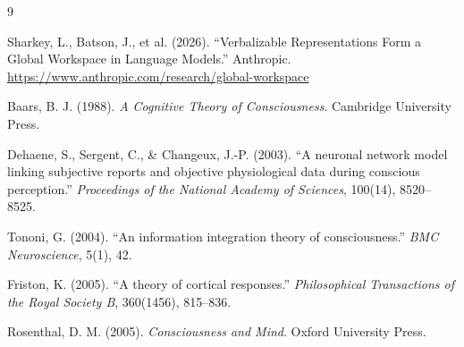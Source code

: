\documentclass[11pt,a4paper]{article}
\theoremstyle{definition}
\begin{document}
\begin{thebibliography}{9}

Sharkey, L., Batson, J., et al. (2026).
``Verbalizable Representations Form a Global Workspace in Language Models.''
Anthropic. \url{https://www.anthropic.com/research/global-workspace}

Baars, B. J. (1988).
\textit{A Cognitive Theory of Consciousness}.
Cambridge University Press.

Dehaene, S., Sergent, C., \& Changeux, J.-P. (2003).
``A neuronal network model linking subjective reports and objective
physiological data during conscious perception.''
\textit{Proceedings of the National Academy of Sciences}, 100(14), 8520--8525.

Tononi, G. (2004).
``An information integration theory of consciousness.''
\textit{BMC Neuroscience}, 5(1), 42.

Friston, K. (2005).
``A theory of cortical responses.''
\textit{Philosophical Transactions of the Royal Society B}, 360(1456), 815--836.

Rosenthal, D. M. (2005).
\textit{Consciousness and Mind}.
Oxford University Press.

\end{thebibliography}
\end{document}
